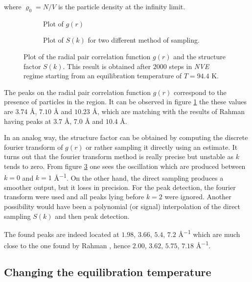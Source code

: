 \documentclass[12pt,english]{smfart}
\begin{document}
where $\varrho_0 = N/V$ is the particle density at the infinity limit. 

\begin{figure}
    \begin{subfigure}{0.5\textwidth}
        \resizebox{\textwidth}{!}{
            
        }
        \caption{Plot of $g(r)$}
        \label{step2_gr}
    \end{subfigure}
    \begin{subfigure}{0.5\textwidth}
        \resizebox{\textwidth}{!}{
            
        }
        \caption{Plot of $S(k)$ for two different method of sampling.}
        \label{step2_sk}
    \end{subfigure}
    \caption{Plot of the radial pair correlation function $g(r)$ and the structure factor $S(k)$. This result is obtained after $2000$ steps  in \textit{NVE} regime starting from an equilibration temperature of $T = 94.4$ \si{K}.}
\end{figure}

The peaks on the radial pair correlation function $g(r)$ correspond to the presence of particles in the region. It can be observed in figure \ref{step2_gr} the these values are $3.74$ \si{\angstrom}, $7.10$ \si{\angstrom} and $10.23$ \si{\angstrom}, which are matching with the results of Rahman \cite{Rahman} having peaks at $3.7$ \si{\angstrom}, $7.0$ \si{\angstrom} and $10.4$ \si{\angstrom}.

In an analog way, the structure factor can be obtained by computing the discrete fourier transform of $g(r)$ or rather sampling it directly using an estimate.
It turns out that the fourier transform method is really precise but unstable as $k$ tends to zero. From figure \ref{step2_sk} one sees the oscillation which are produced between $k = 0$ and $k = 1$ \si{\angstrom^{-1}}.
On the other hand, the direct sampling produces a smoother output, but it loses in precision. 
For the peak detection, the fourier transform were used and all peaks lying before $k = 2$ were ignored. Another possibility would have been a polynomial (or signal) interpolation of the direct sampling $S(k)$ and then peak detection.

The found peaks are indeed located at $1.98$, $3.66$, $5.4$, $7.2$ \si{\angstrom^{-1}} which are much close to the one found by Rahman \cite{Rahman}, hence $2.00$, $3.62$, $5.75$, $7.18$ \si{\angstrom^{-1}}.

\subsection{Changing the equilibration temperature}
\end{document}
